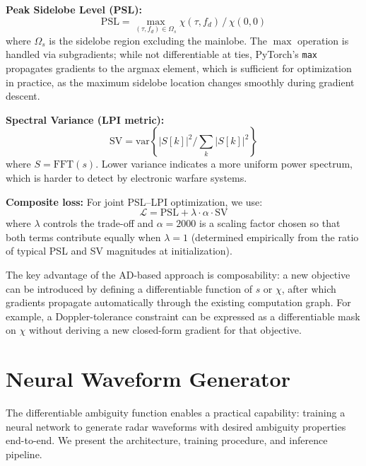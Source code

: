 \documentclass[journal]{IEEEtran}
\begin{document}
\textbf{Peak Sidelobe Level (PSL):}
\begin{equation}
\text{PSL} = \max_{(\tau, f_d) \in \Omega_s} \chi(\tau, f_d) \,/\, \chi(0, 0)
\label{eq:psl}
\end{equation}
where $\Omega_s$ is the sidelobe region excluding the mainlobe.
The $\max$ operation is handled via subgradients; while not differentiable at ties, PyTorch's \texttt{max} propagates gradients to the argmax element, which is sufficient for optimization in practice, as the maximum sidelobe location changes smoothly during gradient descent.

\textbf{Spectral Variance (LPI metric):}
\begin{equation}
\text{SV} = \text{var}\left\{ |S[k]|^2 / \textstyle\sum_k |S[k]|^2 \right\}
\label{eq:spectralvar}
\end{equation}
where $S = \text{FFT}(s)$.
Lower variance indicates a more uniform power spectrum, which is harder to detect by electronic warfare systems.

\textbf{Composite loss:} For joint PSL--LPI optimization, we use:
\begin{equation}
\mathcal{L} = \text{PSL} + \lambda \cdot \alpha \cdot \text{SV}
\label{eq:composite}
\end{equation}
where $\lambda$ controls the trade-off and $\alpha = 2000$ is a scaling factor chosen so that both terms contribute equally when $\lambda = 1$ (determined empirically from the ratio of typical PSL and SV magnitudes at initialization).

The key advantage of the AD-based approach is composability: a new objective can be introduced by defining a differentiable function of $s$ or $\chi$, after which gradients propagate automatically through the existing computation graph.
For example, a Doppler-tolerance constraint can be expressed as a differentiable mask on $\chi$ without deriving a new closed-form gradient for that objective.


\section{Neural Waveform Generator}
\label{sec:neuralgen}

The differentiable ambiguity function enables a practical capability: training a neural network to generate radar waveforms with desired ambiguity properties end-to-end.
We present the architecture, training procedure, and inference pipeline.
\end{document}
